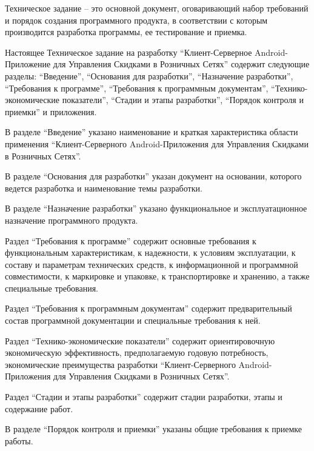 
\tab[0.75cm] Техническое задание – это основной документ, оговаривающий набор требований и
порядок создания программного продукта, в соответствии с которым производится разработка
программы, ее тестирование и приемка.

Настоящее Техническое задание на разработку ``Клиент-Серверное Android-Приложение для Управления Скидками в Розничных Сетях'' содержит следующие разделы: ``Введение'', ``Основания для разработки'',
``Назначение разработки'', ``Требования к программе'', ``Требования к программным документам'',
``Технико-экономические показатели'', ``Стадии и этапы разработки'', ``Порядок контроля и
приемки'' и приложения.

В разделе ``Введение'' указано наименование и краткая характеристика области применения
``Клиент-Серверного Android-Приложения для Управления Скидками в Розничных Сетях''.

В разделе ``Основания для разработки'' указан документ на основании, которого ведется
разработка и наименование темы разработки.

В разделе ``Назначение разработки'' указано функциональное и эксплуатационное
назначение программного продукта.

Раздел ``Требования к программе'' содержит основные требования к функциональным
характеристикам, к надежности, к условиям эксплуатации, к составу и параметрам технических
средств, к информационной и программной совместимости, к маркировке и упаковке, к
транспортировке и хранению, а также специальные требования.

Раздел ``Требования к программным документам'' содержит предварительный состав
программной документации и специальные требования к ней.

Раздел ``Технико-экономические показатели'' содержит ориентировочную экономическую
эффективность, предполагаемую годовую потребность, экономические преимущества разработки
``Клиент-Серверного Android-Приложения для Управления Скидками в Розничных Сетях''.

Раздел ``Стадии и этапы разработки'' содержит стадии разработки, этапы и содержание
работ.

В разделе ``Порядок контроля и приемки'' указаны общие требования к приемке работы.


